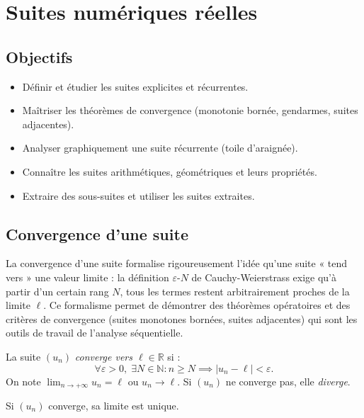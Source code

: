 \documentclass[11pt,a4paper,twoside]{book}
\newcommand{\N}{\mathbb{N}}
\newcommand{\R}{\mathbb{R}}
\begin{document}
\chapter{Suites numériques réelles}

\section*{Objectifs}
\begin{itemize}[leftmargin=1.5em]
  \item Définir et étudier les suites explicites et récurrentes.
  \item Maîtriser les théorèmes de convergence (monotonie bornée, gendarmes, suites adjacentes).
  \item Analyser graphiquement une suite récurrente (toile d'araignée).
  \item Connaître les suites arithmétiques, géométriques et leurs propriétés.
  \item Extraire des sous-suites et utiliser les suites extraites.
\end{itemize}

\section{Convergence d'une suite}

La convergence d'une suite formalise rigoureusement l'idée qu'une suite « tend vers » une valeur limite : la définition $\varepsilon$-$N$ de Cauchy-Weierstrass exige qu'à partir d'un certain rang $N$, tous les termes restent arbitrairement proches de la limite $\ell$. Ce formalisme permet de démontrer des théorèmes opératoires et des critères de convergence (suites monotones bornées, suites adjacentes) qui sont les outils de travail de l'analyse séquentielle.

\begin{definitionbox}
La suite $(u_n)$ \emph{converge vers $\ell \in \R$} si :
\[
  \forall \varepsilon > 0,\;\exists N \in \N : n \geq N \implies |u_n - \ell| < \varepsilon.
\]
On note $\lim_{n\to+\infty} u_n = \ell$ ou $u_n \to \ell$.
Si $(u_n)$ ne converge pas, elle \emph{diverge}.
\end{definitionbox}

\begin{theoremebox}
Si $(u_n)$ converge, sa limite est unique.
\end{theoremebox}
\end{document}
